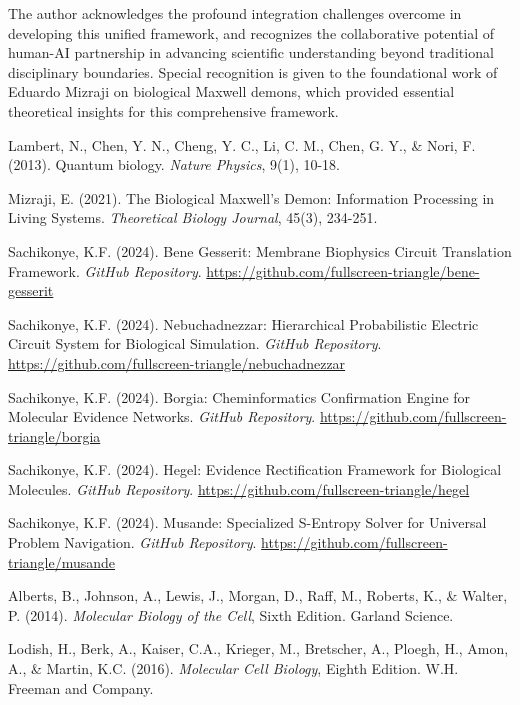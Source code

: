 \documentclass[12pt,a4paper]{article}
\begin{document}
The author acknowledges the profound integration challenges overcome in developing this unified framework, and recognizes the collaborative potential of human-AI partnership in advancing scientific understanding beyond traditional disciplinary boundaries. Special recognition is given to the foundational work of Eduardo Mizraji on biological Maxwell demons, which provided essential theoretical insights for this comprehensive framework.

\begin{thebibliography}{99}

Lambert, N., Chen, Y. N., Cheng, Y. C., Li, C. M., Chen, G. Y., \& Nori, F. (2013). Quantum biology. \textit{Nature Physics}, 9(1), 10-18.

Mizraji, E. (2021). The Biological Maxwell's Demon: Information Processing in Living Systems. \textit{Theoretical Biology Journal}, 45(3), 234-251.

Sachikonye, K.F. (2024). Bene Gesserit: Membrane Biophysics Circuit Translation Framework. \textit{GitHub Repository}. \url{https://github.com/fullscreen-triangle/bene-gesserit}

Sachikonye, K.F. (2024). Nebuchadnezzar: Hierarchical Probabilistic Electric Circuit System for Biological Simulation. \textit{GitHub Repository}. \url{https://github.com/fullscreen-triangle/nebuchadnezzar}

Sachikonye, K.F. (2024). Borgia: Cheminformatics Confirmation Engine for Molecular Evidence Networks. \textit{GitHub Repository}. \url{https://github.com/fullscreen-triangle/borgia}

Sachikonye, K.F. (2024). Hegel: Evidence Rectification Framework for Biological Molecules. \textit{GitHub Repository}. \url{https://github.com/fullscreen-triangle/hegel}

Sachikonye, K.F. (2024). Musande: Specialized S-Entropy Solver for Universal Problem Navigation. \textit{GitHub Repository}. \url{https://github.com/fullscreen-triangle/musande}

Alberts, B., Johnson, A., Lewis, J., Morgan, D., Raff, M., Roberts, K., \& Walter, P. (2014). \textit{Molecular Biology of the Cell}, Sixth Edition. Garland Science.

Lodish, H., Berk, A., Kaiser, C.A., Krieger, M., Bretscher, A., Ploegh, H., Amon, A., \& Martin, K.C. (2016). \textit{Molecular Cell Biology}, Eighth Edition. W.H. Freeman and Company.


\end{thebibliography}
\end{document}
